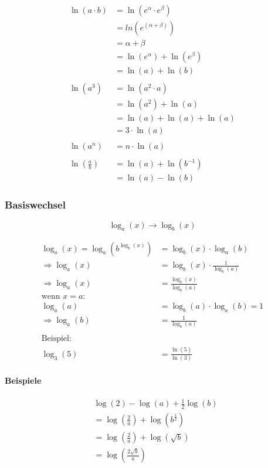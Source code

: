 \begin{align*}
    \ln(a \cdot b) &= \ln(e^{\alpha} \cdot e^{\beta}) \\
    &= ln(e^{(\alpha + \beta)}) \\
    &= \alpha + \beta \\
    &= \ln(e^{\alpha}) + \ln(e^{\beta}) \\
    &= \ln(a) + \ln (b) \\
    \\
    \ln(a^3) &= \ln(a^2 \cdot a) \\
    &= \ln(a^2) + \ln(a) \\
    &= \ln(a) + \ln(a) + \ln(a) \\
    &= 3 \cdot \ln(a) \\
    \\
    \ln(a^n) &= n \cdot \ln(a) \\
    \\
    \ln(\frac{a}{b}) &= \ln(a) + \ln(b^{-1}) \\
    &= \ln(a) - \ln(b)
\end{align*}

\subsubsection{Basiswechsel}
\[
    \log_a(x) \rightarrow \log_b(x)    
\]

\begin{align*}
    \log_a(x) = \log_a\left(b^{\log_b(x)}\right)
    &= \log_b(x) \cdot \log_a(b) \\
    \Rightarrow \log_a(x) &= \log_b(x) \cdot \frac{1}{\log_b(a)} \\
    \Rightarrow \log_a(x) &= \frac{\log_b(x)}{\log_b(a)} \\
    \text{wenn \(x = a\):} \\
    \log_a(a) &= \log_b(a) \cdot \log_a(b) = 1 \\
    \Rightarrow \log_a(b) &= \frac{1}{\log_b(a)} \\
    \\
    \text{Beispiel:} \\
    \log_3(5) &= \frac{\ln(5)}{\ln(3)}
\end{align*}

\paragraph{Beispiele}

\begin{align*}
    & \log(2) - \log(a) + \frac{1}{2} \log(b) \\
    &= \log\left(\frac{2}{a}\right) + \log\left(b^{\frac{1}{2}}\right) \\
    &= \log\left(\frac{2}{a}\right) + \log\left(\sqrt{b}\right) \\
    &= \log\left(\frac{2 \sqrt{b}}{a}\right)
\end{align*}

